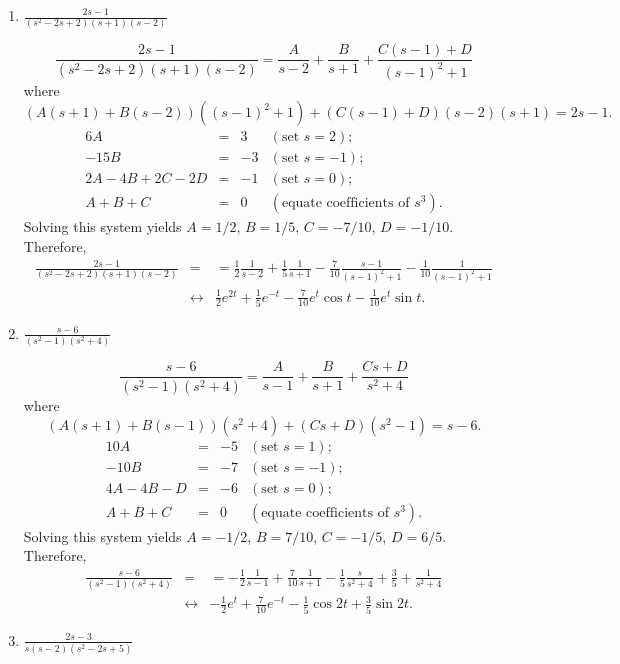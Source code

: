 \documentclass{ximera}
\begin{document}
\begin{problem}
\begin{enumerate}
\item $\frac{2s-1}{(s^2-2s+2)(s+1)(s-2)}$

\begin{solution}
$$
\frac{2s-1}{(s^2-2s+2)(s+1)(s-2)}
=\frac{A}{s-2}+\frac{B}{s+1}+\frac{C(s-1)+D}{(s-1)^2+1}
$$
where
$$
(A(s+1)+B(s-2))((s-1)^2+1)+(C(s-1)+D)(s-2)(s+1)=2s-1.
$$
$$
\begin{array}{rcrl}
6A&=&3&(\mbox{set }s=2);\\
-15B&=&-3& (\mbox{set }s=-1);\\
2A-4B+2C-2D&=&-1& (\mbox{set }s=0);\\
A+B+C&=&0&(\mbox{equate coefficients of }s^3).
\end{array}
$$
Solving this system yields $A=1/2$, $B=1/5$,
$C=-7/10$, $D=-1/10$. Therefore,
\begin{eqnarray*}
\frac{2s-1}{(s^2-2s+2)(s+1)(s-2)}
&=&
=\frac{1}{2}\frac{1}{s-2}+\frac{1}{5}\frac{1}{s+1}-\frac{7}{10}\frac{s-1}{(s-1)^2+1}
-\frac{1}{10}\frac{1}{(s-1)^2+1}
\\&\leftrightarrow&
\frac{1}{2}e^{2t}+\frac{1}{5} e^{-t}
-\frac{7}{10}e^t\cos t-\frac{1}{10}e^t\sin t.
\end{eqnarray*}
\end{solution}

\item $\frac{s-6}{(s^2-1)(s^2+4)}$

\begin{solution}
$$
\frac{s-6}{(s^2-1)(s^2+4)}
=\frac{A}{s-1}+\frac{B}{s+1}+\frac{Cs+D}{s^2+4}
$$
where
$$
(A(s+1)+B(s-1))(s^2+4)+(Cs+D)(s^2-1)=s-6.
$$
$$
\begin{array}{rcrl}
10A&=&-5&(\mbox{set }s=1);\\
-10B&=&-7& (\mbox{set }s=-1);\\
4A-4B-D&=&-6& (\mbox{set }s=0);\\
A+B+C&=&0&(\mbox{equate coefficients of }s^3).
\end{array}
$$
Solving this system yields $A=-1/2$, $B=7/10$,
$C=-1/5$, $D=6/5$. Therefore,
\begin{eqnarray*}
\frac{s-6}{(s^2-1)(s^2+4)}
&=&
=-\frac{1}{2}\frac{1}{s-1}+\frac{7}{10}\frac{1}{s+1}-\frac{1}{5}\frac{s}{s^2+4}
+\frac{3}{5}+\frac{1}{s^2+4}
\\&\leftrightarrow&
-\frac{1}{2}e^t+\frac{7}{10}e^{-t}-\frac{1}{5}\cos 2t+\frac{3}{5}\sin 2t.
\end{eqnarray*}
\end{solution}

\item $\frac{2s-3}{s(s-2)(s^2-2s+5)}$


\end{enumerate}
\end{problem}
\end{document}

